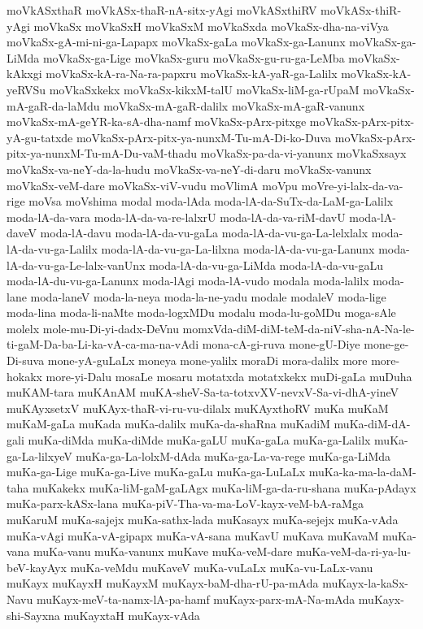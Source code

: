 {moVkASxthaR
moVkASx-thaR-nA-sitx-yAgi
moVkASxthiRV
moVkASx-thiR-yAgi
moVkaSx
moVkaSxH
moVkaSxM
moVkaSxda
moVkaSx-dha-na-viVya
moVkaSx-gA-mi-ni-ga-Lapapx
moVkaSx-gaLa
moVkaSx-ga-Lanunx
moVkaSx-ga-LiMda
moVkaSx-ga-Lige
moVkaSx-guru
moVkaSx-gu-ru-ga-LeMba
moVkaSx-kAkxgi
moVkaSx-kA-ra-Na-ra-papxru
moVkaSx-kA-yaR-ga-Lalilx
moVkaSx-kA-yeRVSu
moVkaSxkekx
moVkaSx-kikxM-talU
moVkaSx-liM-ga-rUpaM
moVkaSx-mA-gaR-da-laMdu
moVkaSx-mA-gaR-dalilx
moVkaSx-mA-gaR-vanunx
moVkaSx-mA-geYR-ka-sA-dha-namf
moVkaSx-pArx-pitxge
moVkaSx-pArx-pitx-yA-gu-tatxde
moVkaSx-pArx-pitx-ya-nunxM-Tu-mA-Di-ko-Duva
moVkaSx-pArx-pitx-ya-nunxM-Tu-mA-Du-vaM-thadu
moVkaSx-pa-da-vi-yanunx
moVkaSxsayx
moVkaSx-va-neY-da-la-hudu
moVkaSx-va-neY-di-daru
moVkaSx-vanunx
moVkaSx-veM-dare
moVkaSx-viV-vudu
moVlimA
moVpu
moVre-yi-lalx-da-va-rige
moVsa
moVshima
modal
moda-lAda
moda-lA-da-SuTx-da-LaM-ga-Lalilx
moda-lA-da-vara
moda-lA-da-va-re-lalxrU
moda-lA-da-va-riM-davU
moda-lA-daveV
moda-lA-davu
moda-lA-da-vu-gaLa
moda-lA-da-vu-ga-La-lelxlalx
moda-lA-da-vu-ga-Lalilx
moda-lA-da-vu-ga-La-lilxna
moda-lA-da-vu-ga-Lanunx
moda-lA-da-vu-ga-Le-lalx-vanUnx
moda-lA-da-vu-ga-LiMda
moda-lA-da-vu-gaLu
moda-lA-du-vu-ga-Lanunx
moda-lAgi
moda-lA-vudo
modala
moda-lalilx
moda-lane
moda-laneV
moda-la-neya
moda-la-ne-yadu
modale
modaleV
moda-lige
moda-lina
moda-li-naMte
moda-logxMDu
modalu
moda-lu-goMDu
moga-sAle
molelx
mole-mu-Di-yi-dadx-DeVnu
momxVda-diM-diM-teM-da-niV-sha-nA-Na-le-ti-gaM-Da-ba-Li-ka-vA-ca-ma-na-vAdi
mona-cA-gi-ruva
mone-gU-Diye
mone-ge-Di-suva
mone-yA-guLaLx
moneya
mone-yalilx
moraDi
mora-dalilx
more
more-hokakx
more-yi-Dalu
mosaLe
mosaru
motatxda
motatxkekx
muDi-gaLa
muDuha
muKAM-tara
muKAnAM
muKA-sheV-Sa-ta-totxvXV-nevxV-Sa-vi-dhA-yineV
muKAyxsetxV
muKAyx-thaR-vi-ru-vu-dilalx
muKAyxthoRV
muKa
muKaM
muKaM-gaLa
muKada
muKa-dalilx
muKa-da-shaRna
muKadiM
muKa-diM-dA-gali
muKa-diMda
muKa-diMde
muKa-gaLU
muKa-gaLa
muKa-ga-Lalilx
muKa-ga-La-lilxyeV
muKa-ga-La-lolxM-dAda
muKa-ga-La-va-rege
muKa-ga-LiMda
muKa-ga-Lige
muKa-ga-Live
muKa-gaLu
muKa-ga-LuLaLx
muKa-ka-ma-la-daM-taha
muKakekx
muKa-liM-gaM-gaLAgx
muKa-liM-ga-da-ru-shana
muKa-pAdayx
muKa-parx-kASx-lana
muKa-piV-Tha-va-ma-LoV-kayx-veM-bA-raMga
muKaruM
muKa-sajejx
muKa-sathx-lada
muKasayx
muKa-sejejx
muKa-vAda
muKa-vAgi
muKa-vA-gipapx
muKa-vA-sana
muKavU
muKava
muKavaM
muKa-vana
muKa-vanu
muKa-vanunx
muKave
muKa-veM-dare
muKa-veM-da-ri-ya-lu-beV-kayAyx
muKa-veMdu
muKaveV
muKa-vuLaLx
muKa-vu-LaLx-vanu
muKayx
muKayxH
muKayxM
muKayx-baM-dha-rU-pa-mAda
muKayx-la-kaSx-Navu
muKayx-meV-ta-namx-lA-pa-hamf
muKayx-parx-mA-Na-mAda
muKayx-shi-Sayxna
muKayxtaH
muKayx-vAda
}
